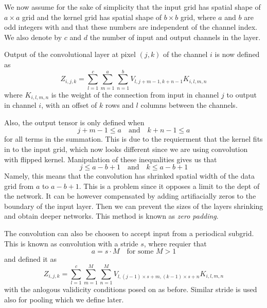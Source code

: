 \documentclass[]{article}
\begin{document}
We now assume for the sake of simplicity that the input grid has spatial shape of
$a \times a$ grid and the kernel grid has spatial shape of $b \times b$ grid, where
$a$ and $b$ are odd integers with
and that these numbers are independent of the channel index. We also denote by $c$
and $d$ the number of input and output channels in the layer.


Output of the convolutional layer at pixel $(j, k)$ of the channel $i$ is now
defined as
\[
Z_{i, j, k} = \sum_{l=1}^c \sum_{m = 1}^a \sum_{n=1}^b
V_{l, j + m -1, k + n -1} K_{i, l, m, n}
\]
where $K_{i, l, m, n}$ is the weight of the connection from input in channel $j$
to output in channel $i$, with an offset of $k$ rows and $l$ columns between the
channels.


Also, the output tensor is only defined when
\[
j + m - 1 \le a \quad \text{and} \quad k + n - 1 \le a
\]
for all terms in the summation. This is due to the requierment that the kernel fits
in to the input grid, which now looks different since we are using convolution
with flipped kernel. Manipulation of these inequalities gives us that
\[
 j \le a - b + 1\quad \text{and} \quad  k \le a - b + 1
\]
Namely, this means that the convolution has shrinked spatial width of the data grid
from $a$ to $a - b + 1$. This is a problem since it opposes a limit to the dept of
the network. It can be however compensated by adding artifiacially zeros to the
boundary of the input layer. Then we can prevent the sizes of the layers shrinking
and obtain deeper networks. This method is known as \emph{zero padding}.

The convolution can also be choosen to accept input from a periodical subgrid.
This is known as convolution with a stride $s$, where requier that
\[
a = s \cdot M \quad \text{for some $M > 1$}
\]
and defined it as
\[
Z_{i, j, k} = \sum_{l=1}^c \sum_{m = 1}^M \sum_{n=1}^M
V_{l, (j -1)\times s + m, (k-1)\times s + n} K_{i, l, m, n}
\]
with the anlogous validicity conditions posed on as before. Similar stride is used
also for pooling which we define later.
\end{document}
